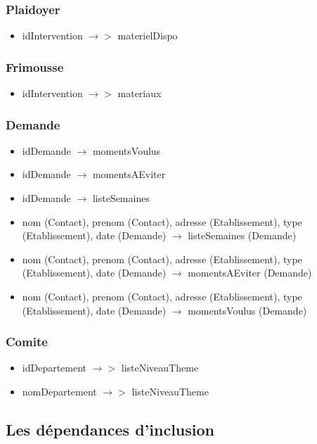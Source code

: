 \subsubsection*{Plaidoyer}
\begin{itemize}
\item[]	idIntervention $\rightarrow >$ materielDispo
\end{itemize}

\subsubsection*{Frimousse}
\begin{itemize}
\item[]	idIntervention $\rightarrow >$ materiaux
\end{itemize}

\subsubsection*{Demande}
\begin{itemize}
\item[] idDemande $\rightarrow$ momentsVoulus
\item[] idDemande $\rightarrow$ momentsAEviter
\item[] idDemande $\rightarrow$ listeSemaines
\item[] nom (Contact), prenom (Contact), adresse (Etablissement), type (Etablissement), date (Demande) $\rightarrow$ listeSemaines (Demande) 
\item[] nom (Contact), prenom (Contact), adresse (Etablissement), type (Etablissement), date (Demande) $\rightarrow$ momentsAEviter (Demande) 
\item[] nom (Contact), prenom (Contact), adresse (Etablissement), type (Etablissement), date (Demande) $\rightarrow$ momentsVoulus (Demande) 
\end{itemize}

\subsubsection*{Comite}
\begin{itemize}
\item[] idDepartement $\rightarrow >$ listeNiveauTheme
\item[] nomDepartement $\rightarrow >$ listeNiveauTheme
\end{itemize}

\subsection{Les dépendances d'inclusion}

